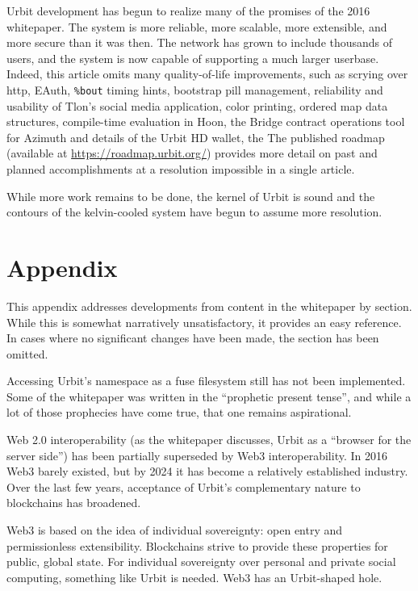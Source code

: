 \documentclass[twoside]{article}
\begin{document}
Urbit development has begun to realize many of the promises of the 2016 whitepaper.  The system is more reliable, more scalable, more extensible, and more secure than it was then.  The network has grown to include thousands of users, and the system is now capable of supporting a much larger userbase.  Indeed, this article omits many quality-of-life improvements, such as scrying over {\sc http}, EAuth, \lstinline[style=inlinecode]{%bout} timing hints, bootstrap pill management, reliability and usability of Tlon's social media application, color printing, ordered map data structures, compile-time evaluation in Hoon, the Bridge contract operations tool for Azimuth and details of the Urbit HD wallet, the 
The published roadmap (available at \url{https://roadmap.urbit.org/}) provides more detail on past and planned accomplishments at a resolution impossible in a single article.

While more work remains to be done, the kernel of Urbit is sound and the contours of the kelvin-cooled system have begun to assume more resolution.  \tombstone{}

\section*{Appendix}

This appendix addresses developments from content in the whitepaper by section.  While this is somewhat narratively unsatisfactory, it provides an easy reference.  In cases where no significant changes have been made, the section has been omitted.

Accessing Urbit's namespace as a {\sc fuse} filesystem still has not been implemented.  Some of the whitepaper was written in the ``prophetic present tense'', and while a lot of those prophecies have come true, that one remains aspirational.

Web 2.0 interoperability (as the whitepaper discusses, Urbit as a ``browser for the server side'') has been partially superseded by Web3 interoperability.  In 2016 Web3 barely existed, but by 2024 it has become a relatively established industry.  Over the last few years, acceptance of Urbit's complementary nature to blockchains has broadened.

Web3 is based on the idea of individual sovereignty: open entry and permissionless extensibility.  Blockchains strive to provide these properties for public, global state.  For individual sovereignty over personal and private social computing, something like Urbit is needed.  Web3 has an Urbit-shaped hole.
\end{document}
